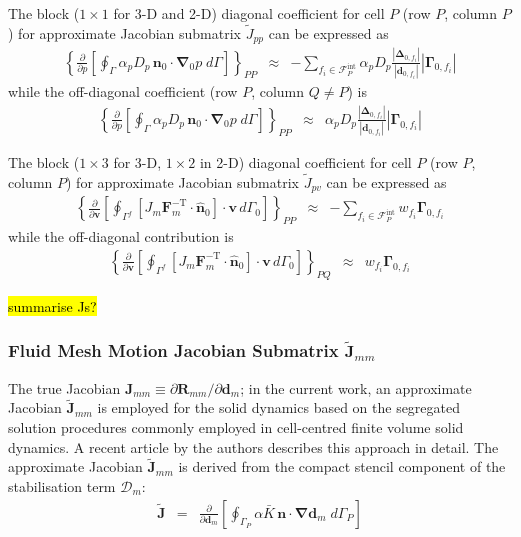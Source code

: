 \documentclass[sn-mathphys,Numbered]{sn-jnl}%
\newcommand{\bb}{\boldsymbol}
\begin{document}
The block ($1\times1$ for 3-D and 2-D) diagonal coefficient for cell $P$ (row $P$, column $P$) for approximate Jacobian submatrix $\tilde{J}_{pp}$ can be expressed as
\begin{eqnarray}
	\left\{
    	\frac{\partial}{\partial p}
	\left[
		\oint_{\Gamma} \alpha_p D_p \, \bb{n}_0 \cdot \bb{\nabla}_0 p \; d\Gamma
	\right]
	\right\}_{PP}
	&\approx&
		- \sum_{f_i \in \mathcal{F}^{\text{int}}_P}  \alpha_p D_p
		\frac{ \left|\bb{\Delta}_{0,f_i} \right| }{\left|\bb{d}_{0,f_i}\right|}    \left|\bb{\Gamma}_{0,f_i}\right|
\end{eqnarray}
while the off-diagonal coefficient (row $P$, column $Q \neq P$) is
\begin{eqnarray}
	\left\{
    	\frac{\partial}{\partial p}
	\left[
		\oint_{\Gamma} \alpha_p D_p \, \bb{n}_0 \cdot \bb{\nabla}_0 p \; d\Gamma
	\right]
	\right\}_{PP}
	&\approx&	   \alpha_p D_p \frac{ \left|\bb{\Delta}_{0,f_i} \right| }{\left|\bb{d}_{0,f_i}\right|}    \left|\bb{\Gamma}_{0,f_i}\right|
\end{eqnarray}


The block ($1\times3$ for 3-D, $1\times2$ in 2-D) diagonal coefficient for cell $P$ (row $P$, column $P$) for approximate Jacobian submatrix $\tilde{J}_{pv}$ can be expressed as
\begin{eqnarray}
	\left\{
    	\frac{\partial}{\partial \bb{v}}
	\left[
		\oint_{\Gamma^f}  \left[ J_m \bb{F}_m^{-\text{T}}  \cdot \hat{\bb{n}}_0 \right] \cdot \bb{v} \, d\Gamma_0
	\right]
	\right\}_{PP}
	&\approx&
		- \sum_{f_i \in \mathcal{F}^{\text{int}}_P} 	w_{f_i} \bb{\Gamma}_{0, f_i}
\end{eqnarray}
while the off-diagonal contribution is
\begin{eqnarray}
	\left\{
    	\frac{\partial}{\partial \bb{v}}
	\left[
		\oint_{\Gamma^f}  \left[ J_m \bb{F}_m^{-\text{T}}  \cdot \hat{\bb{n}}_0 \right] \cdot \bb{v} \, d\Gamma_0
	\right]
	\right\}_{PQ}
	&\approx& w_{f_i} \bb{\Gamma}_{0, f_i}
\end{eqnarray}

\hl{summarise Js?}

\subsubsection[Fluid Mesh Motion Jacobian Submatrices]{Fluid Mesh Motion Jacobian Submatrix $\tilde{\bb{J}}_{mm}$}
The true Jacobian $\bb{J}_{mm} \equiv \partial \bb{R}_{mm}/\partial \bb{d}_m$; in the current work, an approximate Jacobian $\tilde{\bb{J}}_{mm}$ is employed for the solid dynamics based on the segregated solution procedures commonly employed in cell-centred finite volume solid dynamics.
A recent article \citep{Cardiff2025jfnk} by the authors describes this approach in detail.
The approximate Jacobian $\tilde{\bb{J}}_{mm}$ is derived from the compact stencil component of the stabilisation term $\bb{\mathcal{D}}_m$:
\begin{eqnarray}
	\tilde{\bb{J}} &=& \frac{\partial}{\partial \bb{d}_m} \left[ \oint_{\Gamma_P} \alpha \bar{K} \, \bb{n} \cdot \bb{\nabla} \bb{d}_m \; d\Gamma_P \right]
\end{eqnarray}
\end{document}
